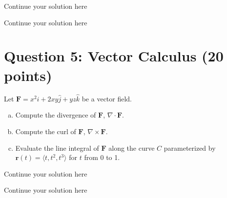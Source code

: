 \documentclass{article}
\begin{document}
\newpage
Continue your solution here
\vspace{4.0in}

\newpage

\newpage
Continue your solution here
\vspace{4.0in}

\newpage

\section*{Question 5: Vector Calculus (20 points)}

Let \( \mathbf{F} = x^2 \hat{i} + 2xy \hat{j} + yz \hat{k} \) be a vector field.

\begin{enumerate}[a)]
  \item Compute the divergence of \( \mathbf{F} \), \( \nabla \cdot \mathbf{F} \).
  \item Compute the curl of \( \mathbf{F} \), \( \nabla \times \mathbf{F} \).
  \item Evaluate the line integral of \( \mathbf{F} \) along the curve \( C \) parameterized by \( \mathbf{r}(t) = \langle t, t^2, t^3 \rangle \) for \( t \) from 0 to 1.
\end{enumerate}

\newpage
Continue your solution here
\vspace{4.0in}

\newpage

\newpage
Continue your solution here
\vspace{4.0in}

\newpage
\end{document}
